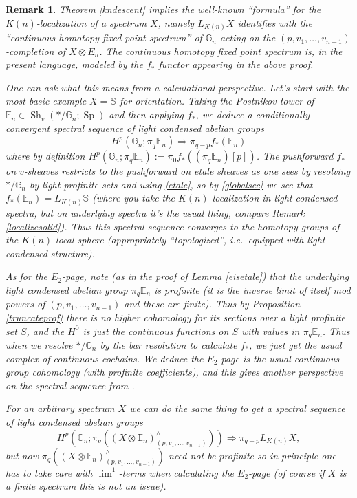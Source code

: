 \documentclass[12pt]{article}
\newtheorem{remark}[theorem]{Remark}
\newcommand{\on}{\operatorname}
\newcommand{\mbb}{\mathbb}
\begin{document}
\begin{remark}
Theorem \ref{kndescent} implies the well-known ``formula'' for the $K(n)$-localization of a spectrum $X$, namely $L_{K(n)}X$ identifies with the ``continuous homotopy fixed point spectrum'' of $\mathbb{G}_n$ acting on the $(p,v_1,\ldots,v_{n-1})$-completion of $X\otimes E_n$.  The continuous homotopy fixed point spectrum is, in the present language, modeled by the $f_\ast$ functor appearing in the above proof.

One can ask what this means from a calculational perspective.  Let's start with the most basic example $X=\mbb{S}$ for orientation.  Taking the Postnikov tower of $\mbb{E}_n\in\on{Sh}_v(\ast/\mbb{G}_n;\on{Sp})$ and then applying $f_\ast$, we deduce a conditionally convergent spectral sequence of light condensed abelian groups
$$H^p(\mbb{G}_n; \pi_q\mbb{E}_n)\Rightarrow \pi_{q-p} f_\ast(\mbb{E}_n)$$
where by definition $H^p(\mbb{G}_n;\pi_q\mbb{E}_n) := \pi_0f_\ast((\pi_q\mbb{E}_n)[p])$.  The pushforward $f_\ast$ on $v$-sheaves restricts to the pushforward on etale sheaves as one sees by resolving $\ast/\mbb{G}_n$ by light profinite sets and using \ref{etale}, so by \ref{globalsec} we see that $f_\ast (\mbb{E}_n)=L_{K(n)}\mbb{S}$ (where you take the $K(n)$-localization in light condensed spectra, but on underlying spectra it's the usual thing, compare Remark \ref{localizesolid}).  Thus this spectral sequence converges to the homotopy groups of the $K(n)$-local sphere (appropriately ``topologized'', i.e.\ equipped with light condensed structure).

As for the $E_2$-page, note (as in the proof of Lemma \ref{eisetale}) that the underlying light condensed abelian group $\pi_q\mbb{E}_n$ is profinite (it is the inverse limit of itself mod powers of $(p,v_1,\ldots,v_{n-1})$ and these are finite). Thus by Proposition \ref{truncateprof} there is no higher cohomology for its sections over a light profinite set $S$, and the $H^0$ is just the continuous functions on $S$ with values in $\pi_q \mbb{E}_n$.  Thus when we resolve $\ast/\mbb{G}_n$ by the bar resolution to calculate $f_\ast$, we just get the usual complex of continuous cochains.  We deduce the $E_2$-page is the usual continuous group cohomology (with profinite coefficients), and this gives another perspective on the spectral sequence from \cite{DevinatzE}.

For an arbitrary spectrum $X$ we can do the same thing to get a spectral sequence of light condensed abelian groups
$$H^p(\mbb{G}_n;\pi_q((X\otimes \mbb{E}_n)^\wedge_{(p,v_1,\ldots,v_{n-1})})) \Rightarrow \pi_{q-p} L_{K(n)}X,$$
but now $\pi_q((X\otimes \mbb{E}_n)^\wedge_{(p,v_1,\ldots,v_{n-1})})$ need not be profinite so in principle one has to take care with $\on{lim}^1$-terms when calculating the $E_2$-page (of course if $X$ is a finite spectrum this is not an issue).
\end{remark}
\end{document}
